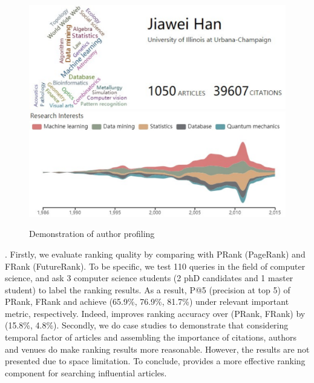 \begin{figure}
\centering
\includegraphics[width=0.98\columnwidth]{hjwAvatar.pdf}
\includegraphics[width=\columnwidth]{hjwInterest.pdf}
\vspace{-5ex}
\caption{Demonstration of author profiling }
\label{fig:hjwProfile}
\vspace{-4ex}
\end{figure}

.
Firstly, we evaluate ranking quality by comparing with PRank (PageRank) and FRank (FutureRank).
To be specific, we test 110 queries in the field of computer science, and ask 3 computer science students (2 phD candidates and 1 master student) to label the ranking results. As a result, P@5 (precision at top 5) of PRank, FRank and \oursystem achieve (65.9\%, 76.9\%, 81.7\%) under relevant important metric, respectively.
Indeed, \oursystem improves ranking accuracy over (PRank, FRank) by (15.8\%, 4.8\%).
Secondly, we do case studies to demonstrate that considering temporal factor of articles and assembling the importance of citations, authors and venues do make ranking results more reasonable. However, the results are not presented due to space limitation.
To conclude, \oursystem provides a more effective ranking component for searching influential articles. %



